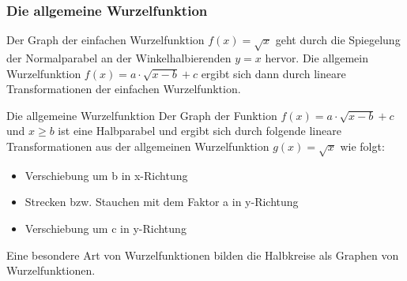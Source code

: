  \subsubsection{Die allgemeine Wurzelfunktion}
 Der Graph der einfachen Wurzelfunktion $f(x) = \sqrt{x}$ geht durch die Spiegelung der Normalparabel an der Winkelhalbierenden $y=x$ hervor. Die allgemein Wurzelfunktion $f(x) = a\cdot \sqrt{x-b} +c$ ergibt sich dann durch lineare Transformationen der einfachen Wurzelfunktion.
 \begin{satz}{Die allgemeine Wurzelfunktion}{}
Der Graph der Funktion $f(x) = a\cdot \sqrt{x-b}+c$ und $x\geq b$ ist eine Halbparabel und ergibt sich durch folgende lineare Transformationen aus der allgemeinen Wurzelfunktion $g(x)= \sqrt{x}$ wie folgt:
\begin{itemize}
    \item Verschiebung um b in x-Richtung
    \item Strecken bzw. Stauchen mit dem Faktor a in y-Richtung
    \item Verschiebung um c in y-Richtung
\end{itemize}
 \end{satz}
 \begin{center}
\end{center}
 Eine besondere Art von Wurzelfunktionen bilden die Halbkreise als Graphen von Wurzelfunktionen.

